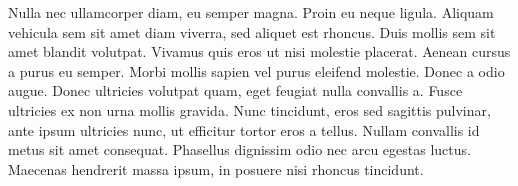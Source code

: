 Nulla nec ullamcorper diam, eu semper magna. Proin eu neque ligula. Aliquam vehicula sem sit amet diam viverra, sed aliquet est rhoncus. Duis mollis sem sit amet blandit volutpat. Vivamus quis eros ut nisi molestie placerat. Aenean cursus a purus eu semper. Morbi mollis sapien vel purus eleifend molestie. Donec a odio augue. Donec ultricies volutpat quam, eget feugiat nulla convallis a. Fusce ultricies ex non urna mollis gravida. Nunc tincidunt, eros sed sagittis pulvinar, ante ipsum ultricies nunc, ut efficitur tortor eros a tellus. Nullam convallis id metus sit amet consequat. Phasellus dignissim odio nec arcu egestas luctus. Maecenas hendrerit massa ipsum, in posuere nisi rhoncus tincidunt.



